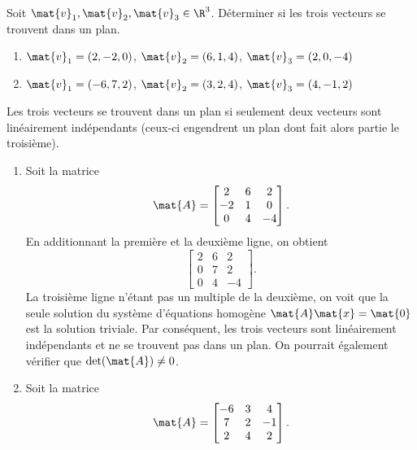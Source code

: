 \begin{exercice}
  Soit $\mat{v}_1, \mat{v}_2, \mat{v}_3 \in \R^3$. Déterminer si
  les trois vecteurs se trouvent dans un plan.
  \begin{enumerate}
  \item $\mat{v}_1 = ( 2, -2,  0)$,
        $\mat{v}_2 = ( 6,  1,  4)$,
        $\mat{v}_3 = ( 2,  0, -4)$
  \item $\mat{v}_1 = (-6,  7,  2)$,
        $\mat{v}_2 = ( 3,  2,  4)$,
        $\mat{v}_3 = ( 4, -1,  2)$
  \end{enumerate}
  \begin{sol}
    Les trois vecteurs se trouvent dans un plan si seulement deux
    vecteurs sont linéairement indépendants (ceux-ci engendrent un
    plan dont fait alors partie le troisième).
    \begin{enumerate}
    \item Soit la matrice
      \begin{displaymath}
        \mat{A} =
        \begin{bmatrix}
          2 & 6 & 2 \\ -2 & 1 & 0 \\ 0 & 4 & -4
        \end{bmatrix}.
      \end{displaymath}
      En additionnant la première et la deuxième ligne, on obtient
      \begin{displaymath}
        \begin{bmatrix}
          2 & 6 & 2 \\ 0 & 7 & 2 \\ 0 & 4 & -4
        \end{bmatrix}.
      \end{displaymath}
      La troisième ligne n'étant pas un multiple de la deuxième, on
      voit que la seule solution du système d'équations homogène
      $\mat{A} \mat{x} = \mat{0}$ est la solution triviale. Par
      conséquent, les trois vecteurs sont linéairement indépendants et
      ne se trouvent pas dans un plan. On pourrait également vérifier
      que $\det(\mat{A}) \neq 0$.
    \item Soit la matrice
      \begin{displaymath}
        \mat{A} =
        \begin{bmatrix}
          -6 & 3 & 4 \\ 7 & 2 & -1 \\ 2 & 4 & 2
        \end{bmatrix}.
      \end{displaymath}

\end{enumerate}
\end{sol}
\end{exercice}
